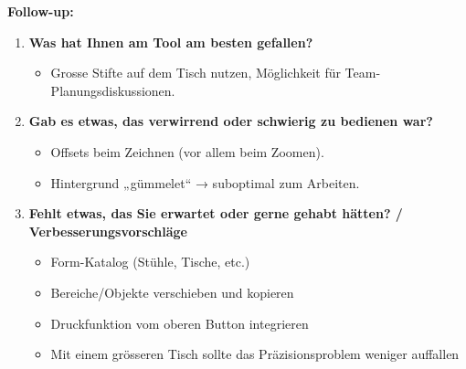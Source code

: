 \textbf{Follow-up:}  
\begin{enumerate}
    \item \textbf{Was hat Ihnen am Tool am besten gefallen?}
    \begin{itemize}
        \item Grosse Stifte auf dem Tisch nutzen, Möglichkeit für Team-Planungsdiskussionen.
    \end{itemize}

    \item \textbf{Gab es etwas, das verwirrend oder schwierig zu bedienen war?}
    \begin{itemize}
        \item Offsets beim Zeichnen (vor allem beim Zoomen).  
        \item Hintergrund „gümmelet“ → suboptimal zum Arbeiten.
    \end{itemize}

    \item \textbf{Fehlt etwas, das Sie erwartet oder gerne gehabt hätten? / Verbesserungsvorschläge}
    \begin{itemize}
        \item Form-Katalog (Stühle, Tische, etc.)  
        \item Bereiche/Objekte verschieben und kopieren  
        \item Druckfunktion vom oberen Button integrieren  
        \item Mit einem grösseren Tisch sollte das Präzisionsproblem weniger auffallen
    \end{itemize}
\end{enumerate}

\clearpage
